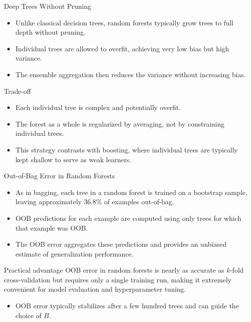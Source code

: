 \begin{frame}{Deep Trees Without Pruning}
  \begin{itemize}
    \item Unlike classical decision trees, random forests typically grow trees to
          \alert{full depth} without pruning.
    \item Individual trees are allowed to overfit, achieving very low bias but high variance.
    \item The ensemble aggregation then \alert{reduces the variance} without increasing bias.
  \end{itemize}
  \begin{block}{Trade-off}
    \begin{itemize}
      \item Each individual tree is complex and potentially overfit.
      \item The forest as a whole is \alert{regularized by averaging}, not by constraining
            individual trees.
    \end{itemize}
  \end{block}
  \begin{itemize}
    \item This strategy contrasts with boosting, where individual trees are typically kept
          shallow to serve as weak learners.
  \end{itemize}
\end{frame}

\begin{frame}{Out-of-Bag Error in Random Forests}
  \begin{itemize}
    \item As in bagging, each tree in a random forest is trained on a bootstrap sample,
          leaving approximately $36.8\%$ of examples out-of-bag.
    \item OOB predictions for each example are computed using only trees for which that
          example was OOB.
    \item The \alert{OOB error} aggregates these predictions and provides an unbiased estimate
          of generalization performance.
  \end{itemize}
  \begin{block}{Practical advantage}
    OOB error in random forests is nearly as accurate as $k$-fold cross-validation but
    requires \alert{only a single training run}, making it extremely convenient for model
    evaluation and hyperparameter tuning.
  \end{block}
  \begin{itemize}
    \item OOB error typically stabilizes after a few hundred trees and can guide the choice of $B$.
  \end{itemize}
\end{frame}

